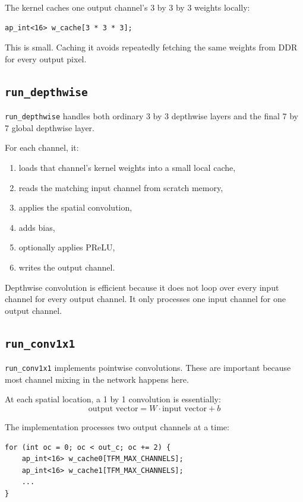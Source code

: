\documentclass[11pt]{article}
\newcommand{\code}[1]{\texttt{#1}}
\begin{document}
The kernel caches one output channel's 3 by 3 by 3 weights locally:

\begin{lstlisting}
ap_int<16> w_cache[3 * 3 * 3];
\end{lstlisting}

This is small.
Caching it avoids repeatedly fetching the same weights from DDR for every output pixel.

\subsection{\code{run\_depthwise}}

\code{run\_depthwise} handles both ordinary 3 by 3 depthwise layers and the final 7 by 7 global depthwise layer.

For each channel, it:

\begin{enumerate}[leftmargin=1.6em]
  \item loads that channel's kernel weights into a small local cache,
  \item reads the matching input channel from scratch memory,
  \item applies the spatial convolution,
  \item adds bias,
  \item optionally applies PReLU,
  \item writes the output channel.
\end{enumerate}

Depthwise convolution is efficient because it does not loop over every input channel for every output channel.
It only processes one input channel for one output channel.

\subsection{\code{run\_conv1x1}}

\code{run\_conv1x1} implements pointwise convolutions.
These are important because most channel mixing in the network happens here.

At each spatial location, a 1 by 1 convolution is essentially:
\[
  \text{output vector} = W \cdot \text{input vector} + b
\]

The implementation processes two output channels at a time:

\begin{lstlisting}
for (int oc = 0; oc < out_c; oc += 2) {
    ap_int<16> w_cache0[TFM_MAX_CHANNELS];
    ap_int<16> w_cache1[TFM_MAX_CHANNELS];
    ...
}
\end{lstlisting}
\end{document}
